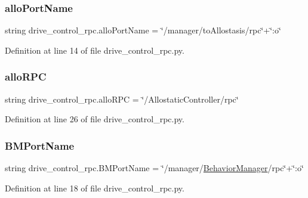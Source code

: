 \subsubsection{\texorpdfstring{allo\+Port\+Name}{alloPortName}}
{\footnotesize\ttfamily string drive\+\_\+control\+\_\+rpc.\+allo\+Port\+Name = \char`\"{}/manager/to\+Allostasis/rpc\char`\"{}+\char`\"{}\+:o\char`\"{}}



Definition at line 14 of file drive\+\_\+control\+\_\+rpc.\+py.

\mbox{\label{namespacedrive__control__rpc_a2cda3eb73a3944cdfd048d403ce65c74}} 
\subsubsection{\texorpdfstring{allo\+R\+PC}{alloRPC}}
{\footnotesize\ttfamily string drive\+\_\+control\+\_\+rpc.\+allo\+R\+PC = \char`\"{}/Allostatic\+Controller/rpc\char`\"{}}



Definition at line 26 of file drive\+\_\+control\+\_\+rpc.\+py.

\mbox{\label{namespacedrive__control__rpc_a366fa62e9ed70cee700accf21969cd1e}} 
\subsubsection{\texorpdfstring{B\+M\+Port\+Name}{BMPortName}}
{\footnotesize\ttfamily string drive\+\_\+control\+\_\+rpc.\+B\+M\+Port\+Name = \char`\"{}/manager/\hyperlink{group__behaviorManager_classBehaviorManager}{Behavior\+Manager}/rpc\char`\"{}+\char`\"{}\+:o\char`\"{}}



Definition at line 18 of file drive\+\_\+control\+\_\+rpc.\+py.

\mbox{\label{namespacedrive__control__rpc_a420b5de110ae5e208dc1ce957f90711e}} 
